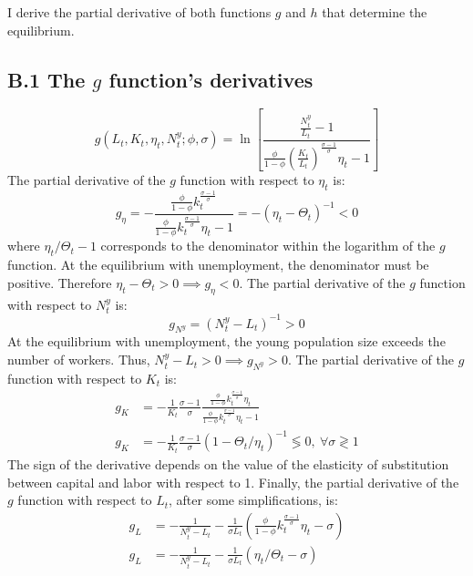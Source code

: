 I derive the partial derivative of both functions $g$ and $h$ that determine the equilibrium.

\subsection*{B.1 The $g$ function's derivatives}

	\begin{equation*}
		g(L_t, K_t, \eta_t, N_t^y; \phi, \sigma) = 
		\ln\left[ \frac{ \frac{N_t^y}{L_t} - 1 } { \frac{\phi}{1-\phi} \left(\frac{K_t}{L_t}\right)^{\frac{\sigma-1}{\sigma}} \eta_t - 1 }\right]
	\end{equation*}
The partial derivative of the $g$ function with respect to $\eta_t$ is:
	\begin{equation*}
		g_\eta = - \frac{\frac{\phi}{1-\phi}k_t^{\frac{\sigma-1}{\sigma}}}{\frac{\phi}{1-\phi}k_t^{\frac{\sigma-1}{\sigma}}\eta_t - 1} = - \left(\eta_t - \Theta_t\right)^{-1} < 0
	\end{equation*}
where $\eta_t/\Theta_t - 1$ corresponds to the denominator within the logarithm of the $g$ function. At the equilibrium with unemployment, the denominator must be positive. Therefore $\eta_t - \Theta_t >0 \implies g_\eta < 0$. The partial derivative of the $g$ function with respect to $N_t^y$ is:
	\begin{equation*}
		g_{N^y} = \left(N_t^y-L_t\right)^{-1} > 0
	\end{equation*}
At the equilibrium with unemployment, the young population size exceeds the number of workers. Thus, $N_t^y-L_t > 0 \implies g_{N^y} > 0$. The partial derivative of the $g$ function with respect to $K_t$ is:
	\begin{align*}
		g_K &= -\frac{1}{K_t}\frac{\sigma - 1}{\sigma}\frac{\frac{\phi}{1-\phi}k_t^{\frac{\sigma-1}{\sigma}}\eta_t}{\frac{\phi}{1-\phi}k_t^{\frac{\sigma-1}{\sigma}}\eta_t - 1} \\
		g_K &= -\frac{1}{K_t}\frac{\sigma - 1}{\sigma}\left(1-\Theta_t/\eta_t\right)^{-1} \lessgtr 0,~\forall \sigma \gtrless 1
	\end{align*}
The sign of the derivative depends on the value of the elasticity of substitution between capital and labor with respect to 1. Finally, the partial derivative of the $g$ function with respect to $L_t$, after some simplifications, is:
	\begin{align*}
		g_L &= -\frac{1}{N_t^y-L_t} - \frac{1}{\sigma L_t} \left(\frac{\phi}{1-\phi}k_t^{\frac{\sigma-1}{\sigma}}\eta_t - \sigma\right) \\
		g_L &= -\frac{1}{N_t^y-L_t} - \frac{1}{\sigma L_t} \left(\eta_t/\Theta_t - \sigma\right)
	\end{align*}
